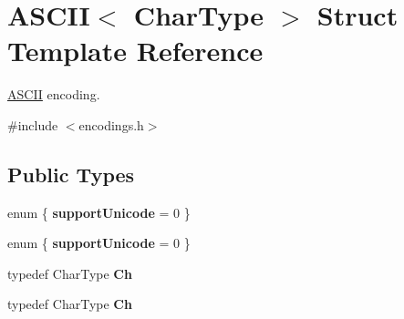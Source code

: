 \hypertarget{structASCII}{}\section{A\+S\+C\+II$<$ Char\+Type $>$ Struct Template Reference}
\label{structASCII}


\hyperlink{structASCII}{A\+S\+C\+II} encoding.  




{\ttfamily \#include $<$encodings.\+h$>$}

\subsection*{Public Types}
\begin{DoxyCompactItemize}
\item 
\mbox{\label{structASCII_a9314d62782b62dbfbe4813227e034322}} 
enum \{ {\bfseries support\+Unicode} = 0
 \}
\item 
\mbox{\label{structASCII_a2a0bf2309e5e01141cd6d747360f76f8}} 
enum \{ {\bfseries support\+Unicode} = 0
 \}
\item 
\mbox{\label{structASCII_a1baf6e7914f165be952c30db664cefb4}} 
typedef Char\+Type {\bfseries Ch}
\item 
\mbox{\label{structASCII_a1baf6e7914f165be952c30db664cefb4}} 
typedef Char\+Type {\bfseries Ch}
\end{DoxyCompactItemize}
